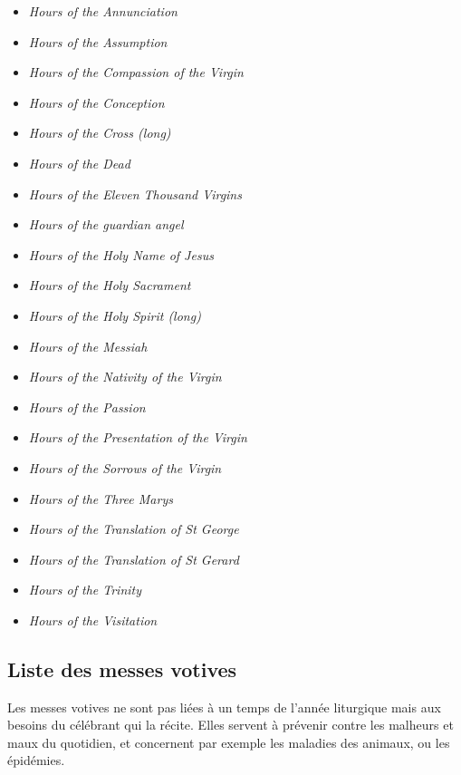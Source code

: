 \documentclass[a4paper,12pt,twoside]{book}
\begin{document}
\begin{multicols}{2}
\begin{itemize}
\item \textit{Hours of the Annunciation}
\item \textit{Hours of the Assumption}
\item \textit{Hours of the Compassion of the Virgin}
\item \textit{Hours of the Conception}
\item \textit{Hours of the Cross (long)}
\item \textit{Hours of the Dead}
\item \textit{Hours of the Eleven Thousand Virgins}
\item \textit{Hours of the guardian angel}
\item \textit{Hours of the Holy Name of Jesus}
\item \textit{Hours of the Holy Sacrament}
\item \textit{Hours of the Holy Spirit (long)}
\item \textit{Hours of the Messiah}
\item \textit{Hours of the Nativity of the Virgin}
\item \textit{Hours of the Passion}
\item \textit{Hours of the Presentation of the Virgin}
\item \textit{Hours of the Sorrows of the Virgin}
\item \textit{Hours of the Three Marys}
\item \textit{Hours of the Translation of St George}
\item \textit{Hours of the Translation of St Gerard}
\item \textit{Hours of the Trinity}
\item \textit{Hours of the Visitation}
	\end{itemize}
	\end{multicols}
	
	\subsection{Liste des messes votives}
	
	Les messes votives ne sont pas liées à un temps de l'année liturgique mais aux besoins du célébrant qui la récite. Elles servent à prévenir contre les malheurs et maux du quotidien, et concernent par exemple les maladies des animaux, ou les épidémies. 
	
\end{document}
